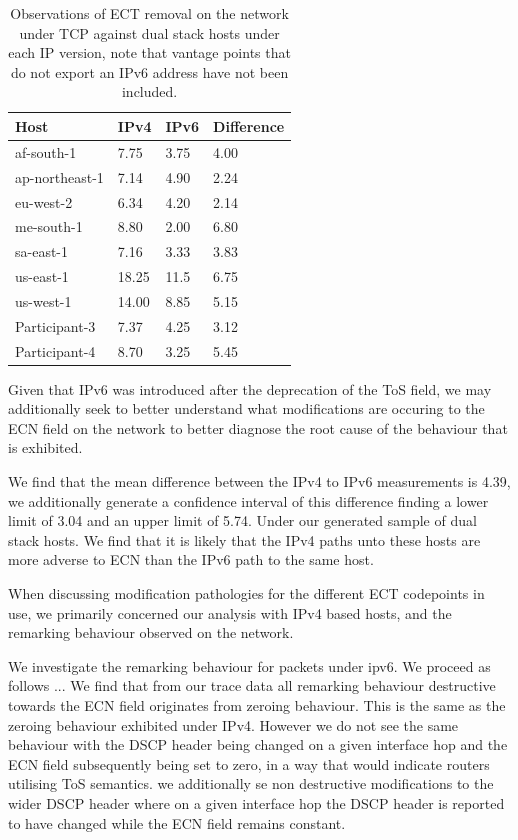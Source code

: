 \documentclass{l4proj}
\begin{document}
\begin{table}[H]
\centering
\begin{tabular}{|l|l|l|l|}
\hline
Host           & IPv4  & IPv6 & Difference \\ \hline
af-south-1     & 7.75  & 3.75 & 4.00      \\ \hline
ap-northeast-1 & 7.14  & 4.90 & 2.24       \\ \hline
eu-west-2      & 6.34  & 4.20 & 2.14       \\ \hline
me-south-1     & 8.80  & 2.00 & 6.80        \\ \hline
sa-east-1      & 7.16  & 3.33 & 3.83       \\ \hline
us-east-1      & 18.25 & 11.5 & 6.75       \\ \hline
us-west-1      & 14.00 & 8.85 & 5.15       \\ \hline
Participant-3   & 7.37  & 4.25 & 3.12       \\ \hline
Participant-4  & 8.70  & 3.25 & 5.45       \\ \hline
\end{tabular}
\caption{Observations of ECT removal on the network under TCP against dual stack hosts under each IP version, note that vantage points that do not export an IPv6 address have not been included.}
\end{table}

Given that IPv6 was introduced after the deprecation of the ToS field, we may additionally seek to better understand what modifications are occuring to the ECN field on the network to better diagnose the root cause of the behaviour that is exhibited.

We find that the mean difference between the IPv4 to IPv6 measurements is 4.39, we additionally generate a confidence interval of this difference finding a lower limit of 3.04 and an upper limit of 5.74. Under our generated sample of dual stack hosts. We find that it is likely that the IPv4 paths unto these hosts are more adverse to ECN than the IPv6 path to the same host.

When discussing modification pathologies for the different ECT codepoints in use, we primarily concerned our analysis with IPv4 based hosts, and the remarking behaviour observed on the network.

We investigate the remarking behaviour for packets under ipv6. We proceed as follows ... We find that from our trace data all remarking behaviour destructive towards the ECN field originates from zeroing behaviour. This is the same as the zeroing behaviour exhibited under IPv4. However we do not see the same behaviour with the DSCP header being changed on a  given interface hop and the ECN field subsequently being set to zero, in a way that would indicate routers utilising ToS semantics.  we additionally se non destructive modifications to the wider DSCP header where on a given interface hop the DSCP header is reported to have changed while the ECN field remains constant. 
\end{document}
